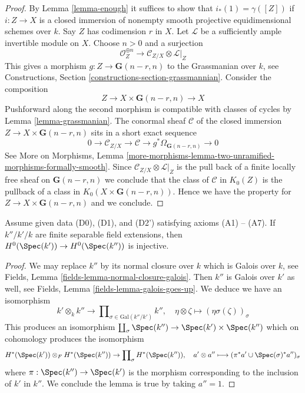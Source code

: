 \begin{proof}
By Lemma \ref{lemma-enough} it suffices to show that $i_*(1) = \gamma([Z])$
if $i : Z \to X$ is a closed immersion of nonempty
smooth projective equidimensional
schemes over $k$. Say $Z$ has codimension $r$ in $X$.
Let $\mathcal{L}$ be a sufficiently ample invertible module on $X$.
Choose $n > 0$ and a surjection
$$
\mathcal{O}_Z^{\oplus n} \to \mathcal{C}_{Z/X} \otimes \mathcal{L}|_Z
$$
This gives a morphism $g : Z \to \mathbf{G}(n - r, n)$
to the Grassmanian over $k$, see
Constructions, Section \ref{constructions-section-grassmannian}.
Consider the composition
$$
Z \to X \times \mathbf{G}(n - r, n) \to X
$$
Pushforward along the second morphism is compatible with classes
of cycles by Lemma \ref{lemma-grassmanian}. The conormal sheaf $\mathcal{C}$
of the closed immersion $Z \to X \times \mathbf{G}(n - r, n)$ sits in
a short exact sequence
$$
0 \to \mathcal{C}_{Z/X} \to \mathcal{C} \to
g^*\Omega_{\mathbf{G}(n - r, n)} \to 0
$$
See More on Morphisms, Lemma
\ref{more-morphisms-lemma-two-unramified-morphisms-formally-smooth}.
Since $\mathcal{C}_{Z/X} \otimes \mathcal{L}|_Z$ is the pull
back of a finite locally free sheaf on $\mathbf{G}(n - r, n)$
we conclude that the class of $\mathcal{C}$ in $K_0(Z)$
is the pullback of a class in $K_0(X \times \mathbf{G}(n - r, n))$.
Hence we have the property for $Z \to X \times \mathbf{G}(n - r, n)$
and we conclude.
\end{proof}

\begin{lemma}
\label{lemma-injective-H0}
Assume given data (D0), (D1), and (D2') satisfying axioms (A1) -- (A7).
If $k''/k'/k$ are finite separable field extensions, then
$H^0(\Spec(k')) \to H^0(\Spec(k''))$ is injective.
\end{lemma}

\begin{proof}
We may replace $k''$ by its normal closure over $k$
which is Galois over $k$, see
Fields, Lemma \ref{fields-lemma-normal-closure-galois}.
Then $k''$ is Galois over $k'$ as well, see
Fields, Lemma \ref{fields-lemma-galois-goes-up}.
We deduce we have an isomorphism
$$
k' \otimes_k k'' \longrightarrow
\prod\nolimits_{\sigma \in \text{Gal}(k''/k')} k'',\quad
\eta \otimes \zeta \longmapsto (\eta \sigma(\zeta))_\sigma
$$
This produces an isomorphism
$\coprod_\sigma \Spec(k'') \to \Spec(k') \times \Spec(k'')$
which on cohomology produces the isomorphism
$$
H^*(\Spec(k')) \otimes_F H^*(\Spec(k''))
\to
\prod\nolimits_\sigma H^*(\Spec(k'')),\quad
a' \otimes a'' \longmapsto (\pi^*a' \cup \Spec(\sigma)^*a'')_\sigma
$$
where $\pi : \Spec(k'') \to \Spec(k')$ is the morphism
corresponding to the inclusion of $k'$ in $k''$.
We conclude the lemma is true by taking $a'' = 1$.
\end{proof}

